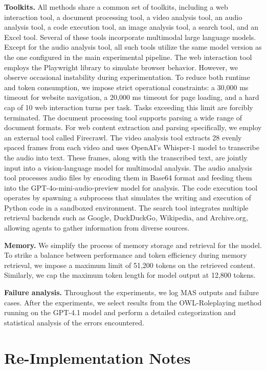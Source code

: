 \documentclass{article}
\begin{document}
\textbf{Toolkits.} All methods share a common set of toolkits, including a web interaction tool, a document processing tool, a video analysis tool, an audio analysis tool, a code execution tool, an image analysis tool, a search tool, and an Excel tool.
Several of these tools incorporate multimodal large language models. 
Except for the audio analysis tool, all such tools utilize the same model version as the one configured in the main experimental pipeline.
The web interaction tool employs the Playwright library to simulate browser behavior.
However, we observe occasional instability during experimentation. 
To reduce both runtime and token consumption, we impose strict operational constraints: a 30,000 ms timeout for website navigation, a 20,000 ms timeout for page loading, and a hard cap of 10 web interaction turns per task. 
Tasks exceeding this limit are forcibly terminated.
The document processing tool supports parsing a wide range of document formats. 
For web content extraction and parsing specifically, we employ an external tool called Firecrawl.
The video analysis tool extracts 28 evenly spaced frames from each video and uses OpenAI’s Whisper-1 model to transcribe the audio into text. 
These frames, along with the transcribed text, are jointly input into a vision-language model for multimodal analysis.
The audio analysis tool processes audio files by encoding them in Base64 format and feeding them into the GPT-4o-mini-audio-preview model for analysis.
The code execution tool operates by spawning a subprocess that simulates the writing and execution of Python code in a sandboxed environment.
The search tool integrates multiple retrieval backends such as Google, DuckDuckGo, Wikipedia, and Archive.org, allowing agents to gather information from diverse sources.

\textbf{Memory.} We simplify the process of memory storage and retrieval for the model. 
To strike a balance between performance and token efficiency during memory retrieval, we impose a maximum limit of 51,200 tokens on the retrieved content. 
Similarly, we cap the maximum token length for model output at 12,800 tokens.

\textbf{Failure analysis.} Throughout the experiments, we log MAS outputs and failure cases. 
After the experiments, we select results from the OWL-Roleplaying method running on the GPT-4.1 model and perform a detailed categorization and statistical analysis of the errors encountered.

\section{Re-Implementation Notes}
\label{sec:reimplementation_notes}
\end{document}
